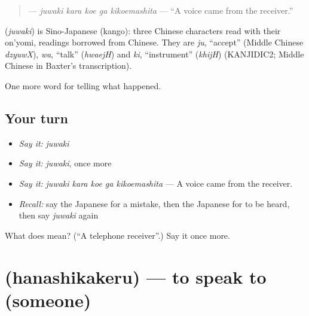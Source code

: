 \begin{quote}
\textbf{  } — \emph{juwaki kara koe ga kikoemashita} — \textquotedblleft{}A voice came from the receiver.\textquotedblright{}
\end{quote}

\begin{cousinweb}
\textbf{} (\emph{juwaki}) is Sino-Japanese (kango): three Chinese characters read with their on'yomi, readings borrowed from Chinese. They are \emph{ju}, \textquotedblleft{}accept\textquotedblright{} (Middle Chinese \emph{dzyuwX}), \emph{wa}, \textquotedblleft{}talk\textquotedblright{} (\emph{hwaejH}) and \emph{ki}, \textquotedblleft{}instrument\textquotedblright{} (\emph{khijH}) (KANJIDIC2; Middle Chinese in Baxter's transcription).
\end{cousinweb}

\begin{grammarlens}[title={What you've built}]
One more word for telling what happened.
\end{grammarlens}

\subsection*{Your turn}
\begin{itemize}
\raggedright
  \item \emph{Say it:} \emph{juwaki}
  \item \emph{Say it:} \emph{juwaki}, once more
  \item \emph{Say it:} \emph{juwaki kara koe ga kikoemashita} — A voice came from the receiver.
  \item \emph{Recall:} say the Japanese for a mistake, then the Japanese for to be heard, then say \emph{juwaki} again
\end{itemize}

\begin{tcolorbox}[breakable,colback=teal!4,colframe=teal!35!black,title={Before you move on}]
What does  mean? (\textquotedblleft{}A telephone receiver\textquotedblright{}.) Say it once more.
\end{tcolorbox}
\section[\texorpdfstring{\ja{はなしかける} (hanashikakeru)}{はなしかける (hanashikakeru)}]{ (hanashikakeru) — to speak to (someone)}


